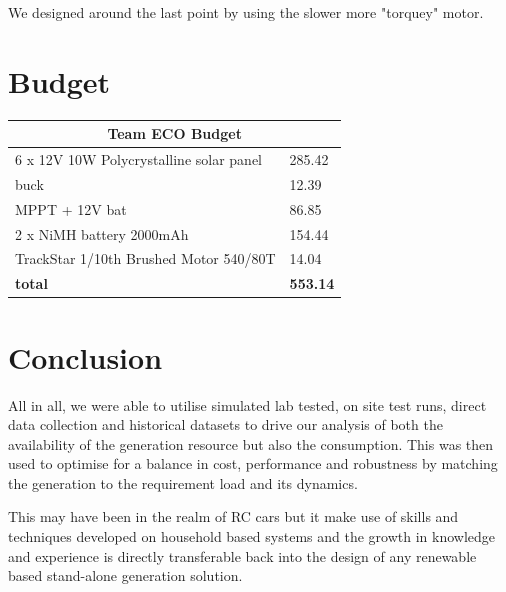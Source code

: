 \documentclass[11pt]{article}
\begin{document}
We designed around the last point by using the slower more "torquey" motor.

\section{Budget}

\begin{table}[h!]
    \begin{center}        
    \begin{tabular}{|l|l|}
    \hline
    \multicolumn{2}{|c|}{\textbf{Team ECO Budget}}            \\ \hline
    6 x 12V 10W Polycrystalline solar panel & 285.42 \\ \hline
    buck                                    & 12.39  \\ \hline
    MPPT + 12V bat                          & 86.85  \\ \hline
    2 x NiMH battery 2000mAh                & 154.44 \\ \hline
    TrackStar 1/10th Brushed Motor 540/80T  & 14.04  \\ \hline
    \textbf{total}                          & \textbf{553.14} \\ \hline
    \end{tabular}
    \end{center}
    \end{table}
\section{Conclusion}
All in all, we were able to utilise simulated lab tested, on site test runs, direct data collection and historical datasets to drive our analysis of both the availability of the generation resource but also the consumption. This was then used to optimise for a balance in cost, performance and robustness by matching the generation to the requirement load and its dynamics.

This may have been in the realm of RC cars but it make use of skills and techniques developed on household based systems and the growth in knowledge and experience is directly transferable back into the design of any renewable based stand-alone generation solution.



\end{document}
